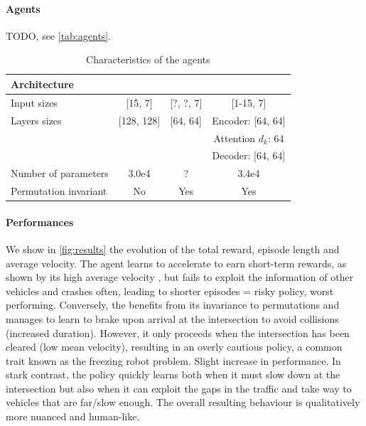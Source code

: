 \documentclass{article}
\begin{document}
\paragraph{Agents}

TODO, see \autoref{tab:agents}.


\begin{table}[tp]
	\centering
	\begin{threeparttable}
		\caption{Characteristics of the agents}
		\label{tab:agents}
		\begin{tabular}{lccc}
			\toprule
			Architecture & \MLPC & \MLPG & \EgoAtt \\
			\midrule 
			Input sizes & [15, 7] & [?, ?, 7] & [1-15, 7] \\
			Layers sizes & [128, 128] &  [64, 64] & Encoder: [64, 64] \\
			& & & Attention $d_k$: 64\\
			& & & Decoder: [64, 64]\\
			Number of parameters & 3.0e4 & ? & 3.4e4 \\
			Permutation invariant & No & Yes & Yes \\
			\bottomrule
		\end{tabular}
	\end{threeparttable}
\end{table}

\paragraph{Performances}

We show in \autoref{fig:results} the evolution of the total reward, episode length and average velocity.
The \MLPC agent learns to accelerate to earn short-term rewards, as shown by its high average velocity , but fails to exploit the information of other vehicles and crashes often, leading to shorter episodes = risky policy, worst performing.
Conversely, the \MLPG benefits from its invariance to permutations and manages to learn to brake upon arrival at the intersection to avoid collisions (increased duration). However, it only proceeds when the intersection has been cleared (low mean velocity), resulting in an overly cautious policy, a common trait known as the freezing robot problem. Slight increase in performance.
In stark contrast, the \EgoAtt policy quickly learns both when it must slow down at the intersection but also when it can exploit the gaps in the traffic and take way to vehicles that are far/slow enough. The overall resulting behaviour is qualitatively more nuanced and human-like.
\end{document}
